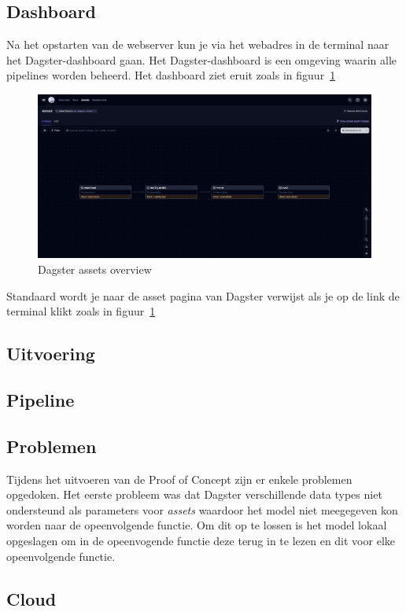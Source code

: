 \subsection{Dashboard}
Na het opstarten van de webserver kun je via het webadres in de terminal naar het Dagster-dashboard gaan. Het Dagster-dashboard is een omgeving waarin alle pipelines worden beheerd.
Het dashboard ziet eruit zoals in figuur~\ref{fig:Dagser_assets}
\begin{figure}
    \centering
    \includegraphics[width=0.9\linewidth]{graphics/Dagster_Assets.PNG}
    \caption{Dagster assets overview}
    \label{fig:Dagser_assets}
\end{figure}
Standaard wordt je naar de asset pagina van Dagster verwijst als je op de link de terminal klikt zoals in figuur~\ref{fig:Dagser_assets}
\subsection{Uitvoering}

\subsection{Pipeline}
\subsection{Problemen}
Tijdens het uitvoeren van de Proof of Concept zijn er enkele problemen opgedoken.
Het eerste probleem was dat Dagster verschillende data types niet ondersteund als parameters voor \textit{assets} waardoor het model niet meegegeven kon worden naar de opeenvolgende functie. Om dit op te lossen is het model lokaal opgeslagen om in de opeenvogende functie deze terug in te lezen en dit voor elke opeenvolgende functie.
\subsection{Cloud}